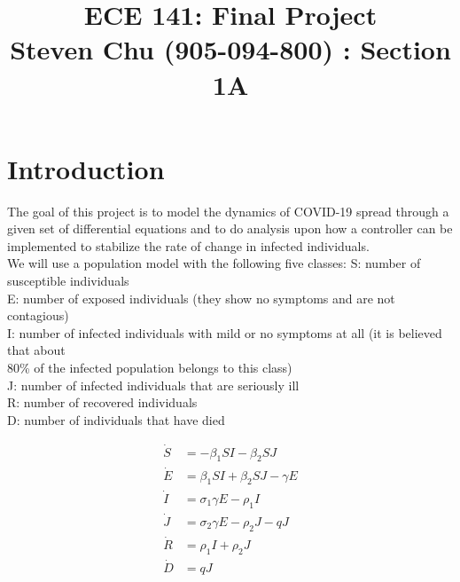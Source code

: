\documentclass[letterpaper,twocolumn,10pt]{article}
\begin{document}
\date{}
\onecolumn

\title{\Large \bf ECE 141: Final Project \\
Steven Chu (905-094-800) : Section 1A}

\maketitle

\section*{Introduction}
The goal of this project is to model the dynamics of COVID-19 spread through a given set of differential equations and to do analysis upon how a controller can be implemented to stabilize the rate of change in infected individuals. \\
We will use a population model with the following five classes:\hspace*{\fill}
\vspace{3mm}
\linebreak
S: number of susceptible individuals\\
E: number of exposed individuals (they show no symptoms and are not contagious)\\
I: number of infected individuals with mild or no symptoms at all (it is believed that about\\
80\% of the infected population belongs to this class)\\
J: number of infected individuals that are seriously ill\\
R: number of recovered individuals\\
D: number of individuals that have died\hspace*{\fill}
\linebreak

\begin{equation*}
\begin{split}
\dot{S} &= -\beta_{1}SI - \beta_{2}SJ\\
\dot{E} &= \beta_{1}SI + \beta_{2}SJ - \gamma E\\
\dot{I} &= \sigma_{1}\gamma E - \rho_{1}I\\
\dot{J} &= \sigma_{2}\gamma E - \rho_{2}J - qJ\\
\dot{R} &= \rho_{1}I + \rho_{2}J\\
\dot{D} &= qJ
\end{split}
\end{equation*}
\end{document}
